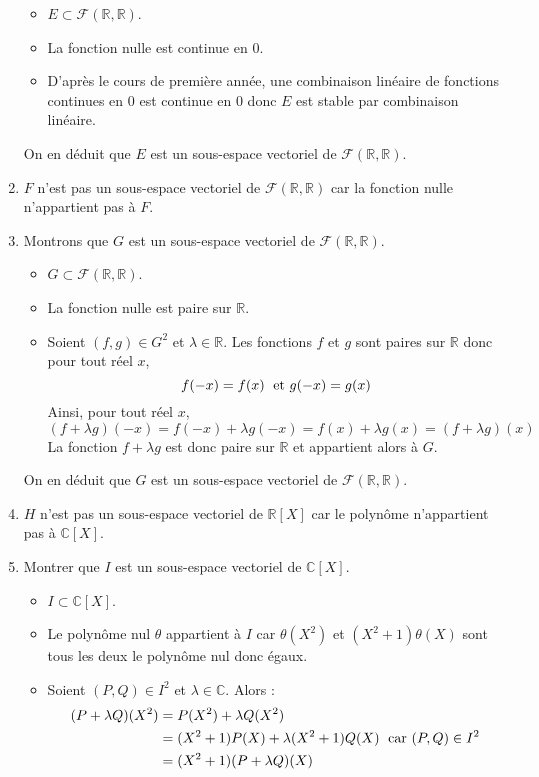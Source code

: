 \documentclass[a4paper,twoside,french,11pt]{VcCours}
\begin{document}
\begin{enumerate}
\begin{itemize}
\item $E \subset \mathcal{F}(\mathbb{R}, \mathbb{R})$.
\item La fonction nulle est continue en $0$.
\item D'après le cours de première année, une combinaison linéaire de fonctions continues en $0$ est continue en $0$ donc $E$ est stable par combinaison linéaire.
\end{itemize}
On en déduit que $E$ est un sous-espace vectoriel de $\mathcal{F}(\mathbb{R}, \mathbb{R})$.
\item $F$ n'est pas un sous-espace vectoriel de $\mathcal{F}(\mathbb{R}, \mathbb{R})$ car la fonction nulle n'appartient pas à $F$.
\item Montrons que $G$ est un sous-espace vectoriel de $\mathcal{F}(\mathbb{R}, \mathbb{R})$.
\begin{itemize}
\item $G \subset \mathcal{F}(\mathbb{R}, \mathbb{R})$.
\item La fonction nulle est paire sur $\mathbb{R}$.
\item Soient $(f,g) \in G^2$ et $\lambda \in \mathbb{R}$. Les fonctions $f$ et $g$ sont paires sur $\mathbb{R}$ donc pour tout réel $x$,
$$ f(-x) = f(x) \; \hbox{ et } g(-x)=g(x)$$
Ainsi, pour tout réel $x$,
$$ (f+ \lambda g)(-x) = f(-x) + \lambda g(-x)= f(x) + \lambda g(x) = (f+ \lambda g)(x)$$
La fonction $f + \lambda g$ est donc paire sur $\mathbb{R}$ et appartient alors à $G$.
\end{itemize}
On en déduit que $G$ est un sous-espace vectoriel de $\mathcal{F}(\mathbb{R}, \mathbb{R})$.
\item $H$ n'est pas un sous-espace vectoriel de $\mathbb{R}[X]$ car le polynôme n'appartient pas à $\mathbb{C}[X]$.
\item Montrer que $I$ est un sous-espace vectoriel de $\mathbb{C}[X]$.
\begin{itemize}
\item $I \subset \mathbb{C}[X]$.
\item Le polynôme nul $\theta$ appartient à $I$ car $\theta(X^2)$ et $(X^2+1) \theta(X)$ sont tous les deux le polynôme nul donc égaux. 
\item Soient $(P,Q) \in I^2$ et $\lambda \in \mathbb{C}$. Alors :
\begin{align*}
(P + \lambda Q)(X^2)  & = P(X^2) + \lambda Q(X^2) \\
& = (X^2+1) P(X) + \lambda (X^2+1) Q(X) \; \hbox{ car } (P,Q) \in I^2 \\
& = (X^2+1)(P+\lambda Q)(X)

\end{align*}
\end{itemize}
\end{enumerate}
\end{document}
